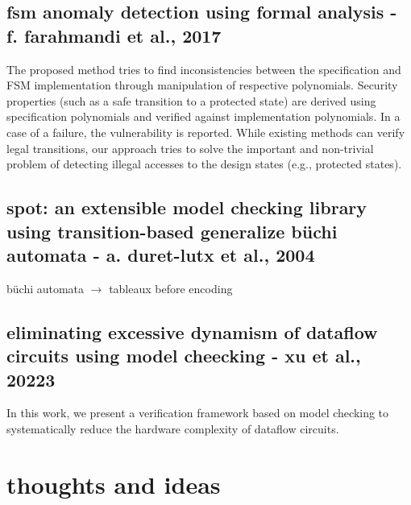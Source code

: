 \documentclass[]{article}
\begin{document}
\subsection{fsm anomaly detection using formal analysis - f. farahmandi et al., 2017}

The proposed method tries to find inconsistencies between the specification and FSM implementation through manipulation of respective polynomials.
Security properties (such as a safe transition to a protected state) are derived using specification polynomials and verified against implementation polynomials. In a case of a failure, the vulnerability is reported. While existing methods can verify legal transitions, our approach tries to solve the important and non-trivial problem of detecting illegal accesses to the design states (e.g., protected states). 

\subsection{spot: an extensible model checking library using transition-based generalize b\"uchi automata - a. duret-lutx et al., 2004}

b\"uchi automata $\rightarrow$ tableaux before encoding 

\subsection{eliminating excessive dynamism of dataflow circuits using model cheecking - xu et al., 20223}

In this work, we present a verification framework based on model checking to systematically reduce the hardware complexity of dataflow circuits.

\section{thoughts and ideas}
\end{document}
